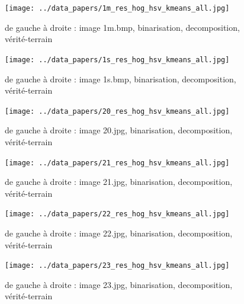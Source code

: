 \documentclass{book}
\begin{document}
\begin{figure}[H]
\begin{center}
\texttt{[image: ../data\_papers/1m\_res\_hog\_hsv\_kmeans\_all.jpg]}
\end{center}
\caption{de gauche à droite : image 1m.bmp, binarisation, decomposition, vérité-terrain}
\label{1m}
\end{figure}
\clearpage


\begin{figure}[H]
\begin{center}
\texttt{[image: ../data\_papers/1s\_res\_hog\_hsv\_kmeans\_all.jpg]}
\end{center}
\caption{de gauche à droite : image 1s.bmp, binarisation, decomposition, vérité-terrain}
\label{1s}
\end{figure}
\clearpage


\begin{figure}[H]
\begin{center}
\texttt{[image: ../data\_papers/20\_res\_hog\_hsv\_kmeans\_all.jpg]}
\end{center}
\caption{de gauche à droite : image 20.jpg, binarisation, decomposition, vérité-terrain}
\label{20}
\end{figure}
\clearpage


\begin{figure}[H]
\begin{center}
\texttt{[image: ../data\_papers/21\_res\_hog\_hsv\_kmeans\_all.jpg]}
\end{center}
\caption{de gauche à droite : image 21.jpg, binarisation, decomposition, vérité-terrain}
\label{21}
\end{figure}
\clearpage


\begin{figure}[H]
\begin{center}
\texttt{[image: ../data\_papers/22\_res\_hog\_hsv\_kmeans\_all.jpg]}
\end{center}
\caption{de gauche à droite : image 22.jpg, binarisation, decomposition, vérité-terrain}
\label{22}
\end{figure}
\clearpage


\begin{figure}[H]
\begin{center}
\texttt{[image: ../data\_papers/23\_res\_hog\_hsv\_kmeans\_all.jpg]}
\end{center}
\caption{de gauche à droite : image 23.jpg, binarisation, decomposition, vérité-terrain}
\label{23}
\end{figure}
\clearpage
\end{document}
